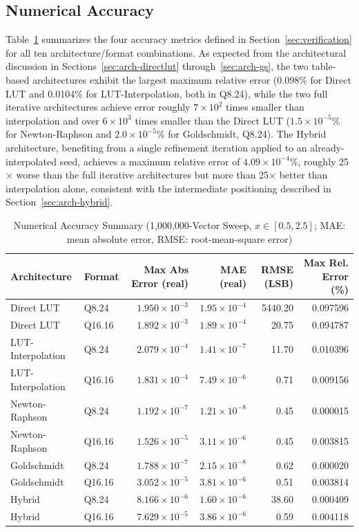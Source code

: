\documentclass[manuscript,screen,review]{acmart}
\begin{document}
\subsection{Numerical Accuracy}
\label{sec:accuracy}

Table~\ref{tab:accuracy} summarizes the four accuracy metrics defined in Section~\ref{sec:verification} for all ten architecture/format combinations. As expected from the architectural discussion in Sections~\ref{sec:arch-directlut} through~\ref{sec:arch-gs}, the two table-based architectures exhibit the largest maximum relative error (0.098\% for Direct LUT and 0.0104\% for LUT-Interpolation, both in Q8.24), while the two full iterative architectures achieve error roughly $7\times10^{2}$ times smaller than interpolation and over $6\times10^{3}$ times smaller than the Direct LUT ($1.5\times10^{-5}$\% for Newton-Raphson and $2.0\times10^{-5}$\% for Goldschmidt, Q8.24). The Hybrid architecture, benefiting from a single refinement iteration applied to an already-interpolated seed, achieves a maximum relative error of $4.09\times10^{-4}$\%, roughly 25$\times$ worse than the full iterative architectures but more than 25$\times$ better than interpolation alone, consistent with the intermediate positioning described in Section~\ref{sec:arch-hybrid}.

\begin{table}[H]
\caption{Numerical Accuracy Summary (1,000,000-Vector Sweep, $x \in [0.5, 2.5]$; MAE: mean absolute error, RMSE: root-mean-square error)}
\label{tab:accuracy}
\begin{tabular}{@{}llrrrr@{}}
\toprule
\textbf{Architecture} & \textbf{Format} & \textbf{Max Abs Error (real)} & \textbf{MAE (real)} & \textbf{RMSE (LSB)} & \textbf{Max Rel. Error (\%)} \\
\midrule
Direct LUT & Q8.24 & $1.950\times10^{-3}$ & $1.95\times10^{-4}$ & 5440.20 & 0.097596 \\
Direct LUT & Q16.16 & $1.892\times10^{-3}$ & $1.89\times10^{-4}$ & 20.75 & 0.094787 \\
LUT-Interpolation & Q8.24 & $2.079\times10^{-4}$ & $1.41\times10^{-7}$ & 11.70 & 0.010396 \\
LUT-Interpolation & Q16.16 & $1.831\times10^{-4}$ & $7.49\times10^{-6}$ & 0.71 & 0.009156 \\
Newton-Raphson & Q8.24 & $1.192\times10^{-7}$ & $1.21\times10^{-8}$ & 0.45 & 0.000015 \\
Newton-Raphson & Q16.16 & $1.526\times10^{-5}$ & $3.11\times10^{-6}$ & 0.45 & 0.003815 \\
Goldschmidt & Q8.24 & $1.788\times10^{-7}$ & $2.15\times10^{-8}$ & 0.62 & 0.000020 \\
Goldschmidt & Q16.16 & $3.052\times10^{-5}$ & $3.81\times10^{-6}$ & 0.51 & 0.003814 \\
Hybrid & Q8.24 & $8.166\times10^{-6}$ & $1.60\times10^{-6}$ & 38.60 & 0.000409 \\
Hybrid & Q16.16 & $7.629\times10^{-5}$ & $3.86\times10^{-6}$ & 0.59 & 0.004118 \\
\bottomrule
\end{tabular}
\end{table}
\end{document}
